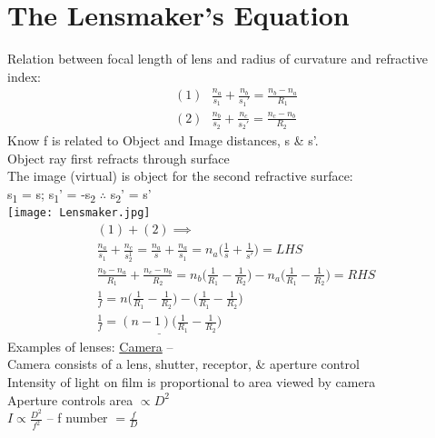 \documentclass[a4paper, 11pt, fleqn, normalem]{report}
\begin{document}
\section{The Lensmaker's Equation}
Relation between focal length of lens and radius of curvature and refractive index:
\begin{gather*}
    (1)~~~\frac{n_{a}}{s_{1}} + \frac{n_{b}}{s_{1}'} = \frac{n_{b} - n_{a}}{R_{1}}\\
    (2)~~~\frac{n_{b}}{s_{2}} + \frac{n_{c}}{s_{2}'} = \frac{n_{c} - n_{b}}{R_{2}}
\end{gather*}
Know f is related to Object and Image distances, s \& s'. \\
Object ray first refracts through surface \\
The image (virtual) is object for the second refractive surface: \\ s\textsubscript{1} = s; s\textsubscript{1}' = -s\textsubscript{2} $\therefore$ s\textsubscript{2}' = s' \\
\texttt{[image: Lensmaker.jpg]}
\begin{gather*}
    (1) + (2) \implies \\
    \frac{n_{a}}{s_{1}} + \frac{n_{c}}{s_{2}^{1}} = \frac{n_{a}}{s} + \frac{n_{a}}{s_{1}} = n_{a}\Big(\frac{1}{s} + \frac{1}{s'}\Big) = LHS \\
    \frac{n_{b} - n_{a}}{R_{1}} + \frac{n_{c} - n_{b}}{R_{2}} = n_{b}\Big(\frac{1}{R_{1}} - \frac{1}{R_{2}}\Big) - n_{a}\Big(\frac{1}{R_{1}} - \frac{1}{R_{2}}\Big) = RHS \\
    \frac{1}{f} = n\Big(\frac{1}{R_{1}} - \frac{1}{R_{2}}\Big) - \Big(\frac{1}{R_{1}} - \frac{1}{R_{2}}\Big) \\
    \underline{\frac{1}{f} = (n - 1)\Big(\frac{1}{R_{1}} - \frac{1}{R_{2}}\Big)}
\end{gather*}
Examples of lenses: \underline{Camera} -- \\
Camera consists of a lens, shutter, receptor, \& aperture control \\
Intensity of light on film is proportional to area viewed by camera \\
Aperture controls area $\propto D^{2}$ \\
$I \propto \frac{D^{2}}{f^{2}}$ -- f number $= \frac{f}{D}$
\end{document}
